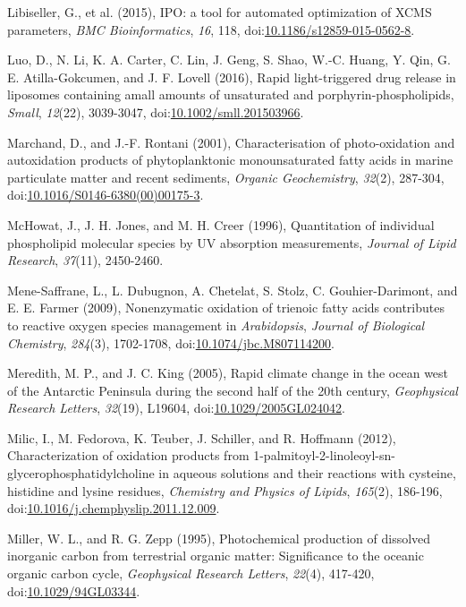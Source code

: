 \begin{singlespace}
{{Libiseller, G., et al. (2015), IPO: a tool for automated optimization of XCMS parameters, \emph{BMC Bioinformatics}, \emph{16}, 118, doi:\href{http://dx.doi.org/10.1186/s12859-015-0562-8}{10.1186/s12859-015-0562-8}.

Luo, D., N. Li, K. A. Carter, C. Lin, J. Geng, S. Shao, W.-C. Huang, Y. Qin, G. E. Atilla-Gokcumen, and J. F. Lovell (2016), Rapid light-triggered drug release in liposomes containing amall amounts of unsaturated and porphyrin-phospholipids, \emph{Small}, \emph{12}(22), 3039-3047, doi:\href{http://dx.doi.org/10.1002/smll.201503966}{10.1002/smll.201503966}.

Marchand, D., and J.-F. Rontani (2001), Characterisation of photo-oxidation and autoxidation products of phytoplanktonic monounsaturated fatty acids in marine particulate matter and recent sediments, \emph{Organic Geochemistry}, \emph{32}(2), 287-304, doi:\href{http://dx.doi.org/10.1016/S0146-6380(00)00175-3}{10.1016/S0146-6380(00)00175-3}.

McHowat, J., J. H. Jones, and M. H. Creer (1996), Quantitation of individual phospholipid molecular species by UV absorption measurements, \emph{Journal of Lipid Research}, \emph{37}(11), 2450-2460.

Mene-Saffrane, L., L. Dubugnon, A. Chetelat, S. Stolz, C. Gouhier-Darimont, and E. E. Farmer (2009), Nonenzymatic oxidation of trienoic fatty acids contributes to reactive oxygen species management in \emph{Arabidopsis}, \emph{Journal of Biological Chemistry}, \emph{284}(3), 1702-1708, doi:\href{http://dx.doi.org/10.1074/jbc.M807114200}{10.1074/jbc.M807114200}.

Meredith, M. P., and J. C. King (2005), Rapid climate change in the ocean west of the Antarctic Peninsula during the second half of the 20th century, \emph{Geophysical Research Letters}, \emph{32}(19), L19604, doi:\href{http://dx.doi.org/10.1029/2005GL024042}{10.1029/2005GL024042}.

Milic, I., M. Fedorova, K. Teuber, J. Schiller, and R. Hoffmann (2012), Characterization of oxidation products from 1-palmitoyl-2-linoleoyl-sn-glycerophosphatidylcholine in aqueous solutions and their reactions with cysteine, histidine and lysine residues, \emph{Chemistry and Physics of Lipids}, \emph{165}(2), 186-196, doi:\href{http://dx.doi.org/10.1016/j.chemphyslip.2011.12.009}{10.1016/j.chemphyslip.2011.12.009}.

Miller, W. L., and R. G. Zepp (1995), Photochemical production of dissolved inorganic carbon from terrestrial organic matter: Significance to the oceanic organic carbon cycle, \emph{Geophysical Research Letters}, \emph{22}(4), 417-420, doi:\href{http://dx.doi.org/10.1029/94GL03344}{10.1029/94GL03344}.

}}
\end{singlespace}
